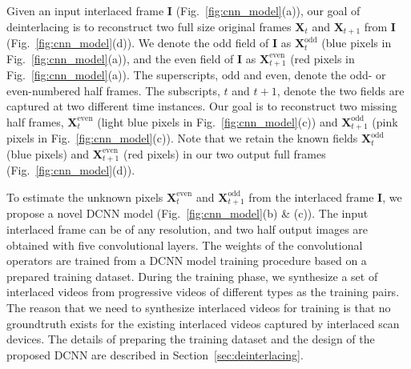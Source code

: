 Given an input interlaced frame $\mathbf{I}$ (Fig.~\ref{fig:cnn_model}(a)),  our
goal of deinterlacing is to reconstruct two full size original frames
$\mathbf{X}_t$ and $\mathbf{X}_{t+1}$ from $\mathbf{I}$
(Fig.~\ref{fig:cnn_model}(d)). We denote the odd field of $\mathbf{I}$ as
$\mathbf{X}^{\text{odd}}_t$ (blue pixels in Fig.~\ref{fig:cnn_model}(a)), and
the even field of $\mathbf{I}$ as $\mathbf{X}^{\text{even}}_{t+1}$ (red pixels in
Fig.~\ref{fig:cnn_model}(a)). The superscripts, $\text{odd}$ and $\text{even}$,
denote the odd- or even-numbered half frames. The subscripts, $t$ and $t+1$,
denote the two fields are captured at two different time instances. Our goal is
to reconstruct two missing half frames, $\mathbf{X}^{\text{even}}_t$ (light blue
pixels in Fig.~\ref{fig:cnn_model}(c)) and $\mathbf{X}^{\text{odd}}_{t+1}$ (pink
pixels in Fig.~\ref{fig:cnn_model}(c)). Note that we retain the known fields
$\mathbf{X}^{\text{odd}}_t$  (blue pixels) and $\mathbf{X}^{\text{even}}_{t+1}$
(red pixels) in our two output full frames (Fig.~\ref{fig:cnn_model}(d)).

To estimate the unknown pixels $\mathbf{X}^{\text{even}}_t$ and
$\mathbf{X}^{\text{odd}}_{t+1}$ from the interlaced frame $\mathbf{I}$, we
propose a novel DCNN model (Fig.~\ref{fig:cnn_model}(b) \& (c)). The input
interlaced frame can be of any resolution, and two half output images are
obtained with five convolutional layers. The weights of the convolutional
operators are trained from a DCNN model training procedure based on a prepared
training dataset. During the training phase, we synthesize a set of interlaced
videos from progressive videos of different types as the training pairs. The
reason that we need to synthesize interlaced videos for training is that no
groundtruth exists for the existing interlaced videos captured by interlaced
scan devices. The details of preparing the training dataset and the design
of the proposed DCNN are described in Section~\ref{sec:deinterlacing}. 